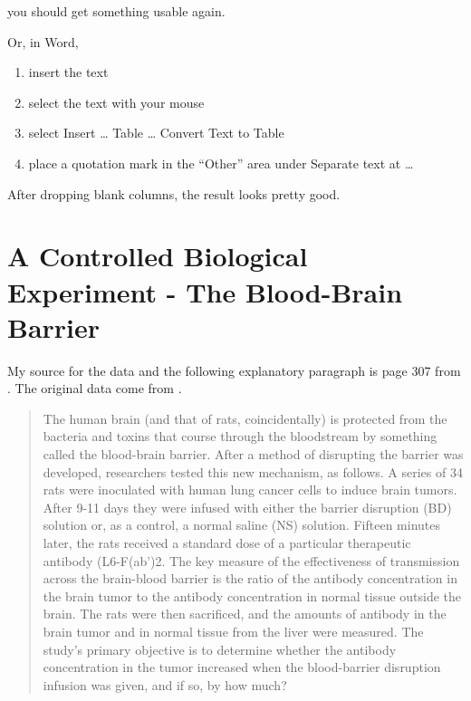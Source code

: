 \documentclass[]{book}
\providecommand{\tightlist}{%
  \setlength{\itemsep}{0pt}\setlength{\parskip}{0pt}}
\theoremstyle{definition}
\theoremstyle{definition}
\theoremstyle{definition}
\theoremstyle{remark}
\begin{document}
you should get something usable again.

Or, in Word,

\begin{enumerate}
\def\labelenumi{\arabic{enumi}.}
\tightlist
\item
  insert the text
\item
  select the text with your mouse
\item
  select Insert \ldots{} Table \ldots{} Convert Text to Table
\item
  place a quotation mark in the ``Other'' area under Separate text at
  \ldots{}
\end{enumerate}

After dropping blank columns, the result looks pretty good.

\section{A Controlled Biological Experiment - The Blood-Brain
Barrier}\label{a-controlled-biological-experiment---the-blood-brain-barrier}

My source for the data and the following explanatory paragraph is page
307 from \citet{RamseySchafer2002}. The original data come from
\citet{Barnett1995}.

\begin{quote}
The human brain (and that of rats, coincidentally) is protected from the
bacteria and toxins that course through the bloodstream by something
called the blood-brain barrier. After a method of disrupting the barrier
was developed, researchers tested this new mechanism, as follows. A
series of 34 rats were inoculated with human lung cancer cells to induce
brain tumors. After 9-11 days they were infused with either the barrier
disruption (BD) solution or, as a control, a normal saline (NS)
solution. Fifteen minutes later, the rats received a standard dose of a
particular therapeutic antibody (L6-F(ab')2. The key measure of the
effectiveness of transmission across the brain-blood barrier is the
ratio of the antibody concentration in the brain tumor to the antibody
concentration in normal tissue outside the brain. The rats were then
sacrificed, and the amounts of antibody in the brain tumor and in normal
tissue from the liver were measured. The study's primary objective is to
determine whether the antibody concentration in the tumor increased when
the blood-barrier disruption infusion was given, and if so, by how much?
\end{quote}
\end{document}
